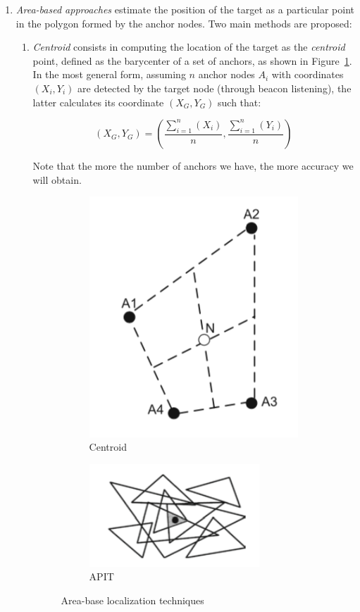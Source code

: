 \documentclass[a4paper,12pt]{article}
\begin{document}
\begin{enumerate}[label=(\alph*)]
  \item \textit{Area-based approaches} estimate the position of the target as a particular point in the polygon formed by the anchor nodes. Two main methods are proposed:
  \begin{enumerate}[label=(\roman*)]
    \item \textit{Centroid} consists in computing the location of the target as the \textit{centroid} point, defined as the barycenter of a set of anchors, as shown in Figure~\ref{fig:centroid}. In the most general form, assuming $n$ anchor nodes $A_i$ with coordinates $(X_i, Y_i )$ are detected by the target node (through beacon listening), the latter calculates its
    coordinate $(X_G, Y_G)$ such that:

    \begin{equation}
    (X_G, Y_G) = (\frac{\sum_{i=1}^n(X_i)}{n}, \frac{\sum_{i=1}^n(Y_i)}{n})
    \end{equation}

    Note that the more the number of anchors we have, the more accuracy we will obtain.

    \begin{figure}[t]
      \centering
      \begin{subfigure}{.5\textwidth}
        \centering
        \includegraphics[width=.4\linewidth]{img/centroid}
        \caption{\label{fig:centroid}Centroid}
      \end{subfigure}%
      \begin{subfigure}{.5\textwidth}
        \centering
        \includegraphics[width=.4\linewidth]{img/apit}
        \caption{\label{fig:apit}APIT}
      \end{subfigure}
      \caption{Area-base localization techniques}
    \end{figure}


\end{enumerate}
\end{enumerate}
\end{document}
